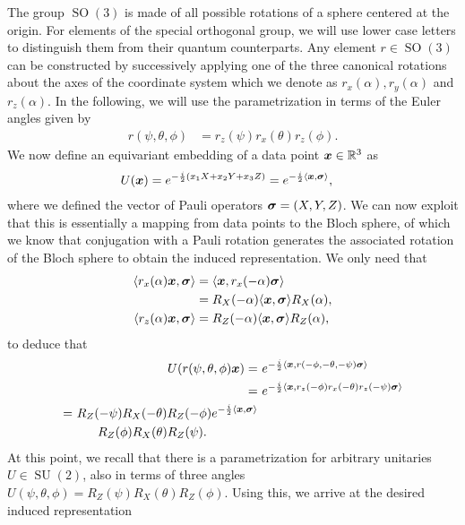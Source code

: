 \documentclass[a4paper,twocolumn,notitlepage,nofootinbib,superscriptaddress,floatfix]{revtex4-2}
\DeclareMathOperator{\SO}{\ensuremath{SO}}
\DeclareMathOperator{\SU}{\ensuremath{SU}}
\begin{document}
The group $\SO(3)$ is made of all possible rotations of a sphere centered at the origin.
For elements of the special orthogonal group, we will use lower case letters to distinguish them from their quantum counterparts.
Any element $r \in \SO(3)$ can be constructed by successively applying one of the three canonical rotations about the axes of the coordinate system which we denote as $r_x(\alpha), r_y(\alpha)$ and $r_z(\alpha)$.
In the following, we will use the parametrization in terms of the Euler angles given by
\begin{align}
    r(\psi,\theta,\phi) &= r_z(\psi)r_x(\theta)r_z(\phi).
\end{align}
We now define an equivariant embedding of a data point $\boldsymbol{x}\in\mathbb{R}^3$ as
\begin{align}
    U(\boldsymbol{x}) &= e^{-\frac{i}{2}(x_1X+x_2Y+x_3Z)} 
    = e^{-\frac{i}{2} \langle \boldsymbol{x}, \boldsymbol{\sigma} \rangle},
\end{align}
where we defined the vector of Pauli operators ${\boldsymbol{\sigma}=(X,Y,Z)}$.
We can now exploit that this is essentially a mapping from data points to the Bloch sphere, of which we know that conjugation with a Pauli rotation generates the associated rotation of the Bloch sphere to obtain the induced representation. We only need that
\begin{align}
    \langle r_x(\alpha) \boldsymbol{x}, \boldsymbol{\sigma} \rangle &= \langle \boldsymbol{x}, r_x(-\alpha) \boldsymbol{\sigma} \rangle\\
    &= R_X(-\alpha) \langle \boldsymbol{x}, \boldsymbol{\sigma} \rangle R_X(\alpha),\\
    \langle r_z(\alpha) \boldsymbol{x}, \boldsymbol{\sigma} \rangle &= R_Z(-\alpha) \langle \boldsymbol{x}, \boldsymbol{\sigma} \rangle R_Z(\alpha),
\end{align}
to deduce that
\begin{align}
    ~U(r(\psi, \theta, \phi) \boldsymbol{x}) 
     =&~ e^{-\frac{i}{2}\langle \boldsymbol{x}, r(-\phi, -\theta, -\psi) \boldsymbol{\sigma} \rangle} \\
     =&~ e^{-\frac{i}{2}\langle \boldsymbol{x}, r_z(-\phi)r_x(-\theta)r_z(-\psi) \boldsymbol{\sigma} \rangle} \\
     \begin{split}
     =&~ R_Z(-\psi) R_X(-\theta) R_Z(-\phi) e^{-\frac{i}{2}\langle \boldsymbol{x}, \boldsymbol{\sigma} \rangle}\\
     &\qquad  R_Z(\phi) R_X(\theta)R_Z(\psi).
     \end{split}
\end{align}
At this point, we recall that there is a parametrization for arbitrary unitaries $U\in\SU(2)$, also in terms of three angles $U(\psi,\theta,\phi) = R_Z(\psi)R_X(\theta)R_Z(\phi)$. Using this, we arrive at the desired induced representation
\end{document}
